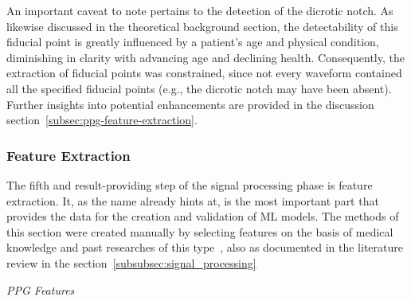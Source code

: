 An important caveat to note pertains to the detection of the dicrotic notch.
As likewise discussed in the theoretical background section, the detectability of this fiducial point is greatly influenced by a patient's age and physical condition,
diminishing in clarity with advancing age and declining health.
Consequently, the extraction of fiducial points was constrained, since not every waveform contained all the specified fiducial points (e.g., the dicrotic notch may have been absent).
Further insights into potential enhancements are provided in the discussion section~\ref{subsec:ppg-feature-extraction}.

\subsubsection{Feature Extraction}
\label{subsubsec:features}

The fifth and result-providing step of the signal processing phase is feature extraction.
It, as the name already hints at, is the most important part that provides the data for the creation and validation of ML models.
The methods of this section were created manually by selecting features on the basis of medical knowledge and past researches of this type~\cite{el-hajjDeepLearningModels2021, charltonAssessingHemodynamicsPhotoplethysmogram2022, maqsoodSurveyShallowDeep2022},
also as documented in the literature review in the section~\ref{subsubsec:signal_processing}

\vspace{0.2cm}
\textit{PPG Features}
\vspace{0.2cm}

